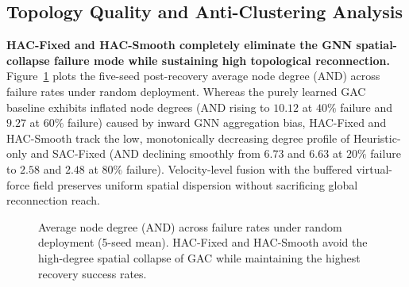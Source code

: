 \documentclass[11pt]{article}
\theoremstyle{plain}
\theoremstyle{definition}
\theoremstyle{remark}
\begin{document}
\subsection{Topology Quality and Anti-Clustering Analysis}
\textbf{HAC-Fixed and HAC-Smooth completely eliminate the GNN spatial-collapse failure mode while sustaining high topological reconnection.} Figure~\ref{fig:and-random} plots the five-seed post-recovery average node degree ($\mathrm{AND}$) across failure rates under random deployment. Whereas the purely learned GAC baseline exhibits inflated node degrees ($\mathrm{AND}$ rising to $10.12$ at $40\%$ failure and $9.27$ at $60\%$ failure) caused by inward GNN aggregation bias, HAC-Fixed and HAC-Smooth track the low, monotonically decreasing degree profile of Heuristic-only and SAC-Fixed ($\mathrm{AND}$ declining smoothly from $6.73$ and $6.63$ at $20\%$ failure to $2.58$ and $2.48$ at $80\%$ failure). Velocity-level fusion with the buffered virtual-force field preserves uniform spatial dispersion without sacrificing global reconnection reach.

\begin{figure}[t]
\centering
{}
\caption{Average node degree (AND) across failure rates under random deployment (5-seed mean). HAC-Fixed and HAC-Smooth avoid the high-degree spatial collapse of GAC while maintaining the highest recovery success rates.}
\label{fig:and-random}
\end{figure}
\end{document}
